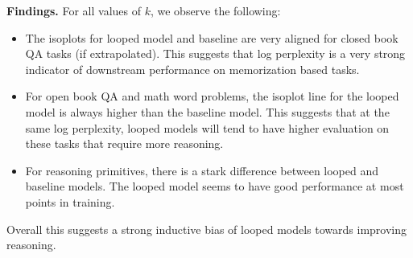 {\bf Findings.} For all values of $k$, we observe the following:
\begin{itemize}[leftmargin=0.6cm]
    \item The isoplots for  looped model and  baseline are very aligned for closed book QA tasks (if extrapolated). This suggests that log perplexity is a very strong indicator of downstream performance on memorization based tasks.
    \item For open book QA and math word problems, the isoplot line for the looped model is always higher than the baseline model. This suggests that at the same log perplexity, looped models will tend to have higher evaluation on these tasks that require more reasoning.
    \item For reasoning primitives, there is a stark difference between looped and baseline models. The looped model seems to have good performance at most points in training.
\end{itemize}

Overall this suggests a strong inductive bias of looped models towards improving reasoning. 



